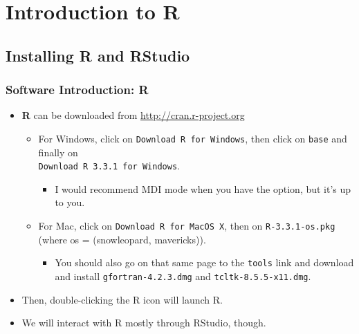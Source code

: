 \documentclass[11pt,containsverbatim,handout]{beamer}
\begin{document}
\section{Introduction to R}





\subsection{Installing R and RStudio}

\begin{frame}[fragile]

\frametitle{Software Introduction: R}

\begin{itemize}
	\item \textbf{R} can be downloaded from \url{http://cran.r-project.org}
	\begin{itemize}
		\item For Windows, click on \verb"Download R for Windows", then click on \verb"base" and finally on\\ \verb"Download R 3.3.1 for Windows". 
		\begin{itemize}
			\item I would recommend MDI mode when you have the option, but it's up to you. 
		\end{itemize}
		
		\item For Mac, click on \verb"Download R for MacOS X", then on \verb"R-3.3.1-os.pkg" (where os = (snowleopard, mavericks)).  
			\begin{itemize}
				\item You should also go on that same page to the \verb"tools" link and download and install \verb"gfortran-4.2.3.dmg" and \verb"tcltk-8.5.5-x11.dmg". 
			\end{itemize}
	\end{itemize}

	\item Then, double-clicking the R icon will launch R. 

	\item We will interact with R mostly through RStudio, though. 

\end{itemize}

\end{frame}
\end{document}
